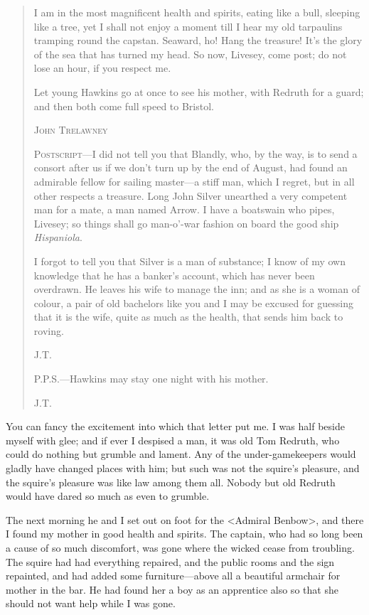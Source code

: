 \begin{quotation}
I am in the most magnificent health and spirits, eating like a bull, sleeping like a tree, yet I shall not enjoy a moment till I hear my old tarpaulins tramping round the capstan. Seaward, ho! Hang the treasure! It's the glory of the sea that has turned my head. So now, Livesey, come post; do not lose an hour, if you respect me.

Let young Hawkins go at once to see his mother, with Redruth for a guard; and then both come full speed to Bristol.
\begin{flushright}
\textsc{John Trelawney}
\end{flushright}


\textsc{Postscript}—I did not tell you that Blandly, who, by the way, is to send a consort after us if we don't turn up by the end of August, had found an admirable fellow for sailing master—a stiff man, which I regret, but in all other respects a treasure. Long John Silver unearthed a very competent man for a mate, a man named Arrow. I have a boatswain who pipes, Livesey; so things shall go man-o'-war fashion on board the good ship \textit{Hispaniola}.

I forgot to tell you that Silver is a man of substance; I know of my own knowledge that he has a banker's account, which has never been overdrawn. He leaves his wife to manage the inn; and as she is a woman of colour, a pair of old bachelors like you and I may be excused for guessing that it is the wife, quite as much as the health, that sends him back to roving.
\begin{flushright}
\textsc{J\@.T\@.}
\end{flushright}

\textsc{P\@.P\@.S\@.}—Hawkins may stay one night with his mother.\\
\begin{flushright}
\textsc{J\@.T\@.}
\end{flushright}

\end{quotation}

You can fancy the excitement into which that letter put me. I was half beside myself with glee; and if ever I despised a man, it was old Tom Redruth, who could do nothing but grumble and lament. Any of the under-gamekeepers would gladly have changed places with him; but such was not the squire's pleasure, and the squire's pleasure was like law among them all. Nobody but old Redruth would have dared so much as even to grumble.

The next morning he and I set out on foot for the <Admiral Benbow>, and there I found my mother in good health and spirits. The captain, who had so long been a cause of so much discomfort, was gone where the wicked cease from troubling. The squire had had everything repaired, and the public rooms and the sign repainted, and had added some furniture—above all a beautiful armchair for mother in the bar. He had found her a boy as an apprentice also so that she should not want help while I was gone.

